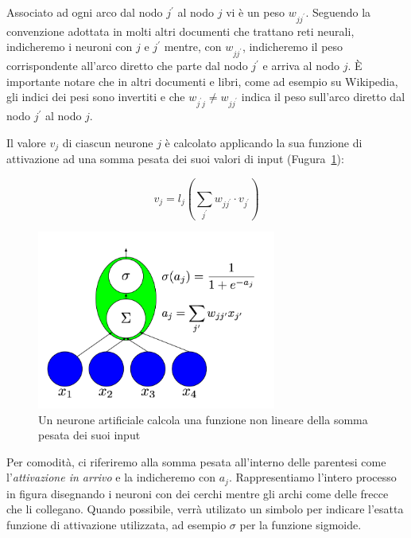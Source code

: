 Associato ad ogni arco dal nodo $j^{'}$ al nodo $j$ vi \`e un peso $w_{jj^{'}}$.
Seguendo la convenzione adottata in molti altri documenti che trattano reti neurali,
indicheremo i neuroni con $j$ e $j^{'}$ mentre, con $w_{jj^{'}}$, indicheremo il
peso corrispondente all'arco diretto che parte dal nodo $j^{'}$ e arriva al nodo $j$.
\`E importante notare che in altri documenti e libri, come ad esempio su Wikipedia,
gli indici dei pesi sono invertiti e che $w_{j^{'}j} \neq w_{jj^{'}}$ indica il
peso sull'arco diretto dal nodo $j^{'}$ al nodo $j$.

Il valore $v_j$ di ciascun neurone $j$ \`e calcolato applicando la sua funzione
di attivazione ad una somma pesata dei suoi valori di input
(Fugura~\ref{fig:artificialNeuron}): %

\begin{equation} %
  v_j = l_j\left( \sum_{j^{'}} w_{jj^{'}} \cdot v_{j^{'}} \right)
\end{equation}

\begin{figure}[tp]
  \centering
  \begin{center}
    \includegraphics[width=0.7\textwidth]{./images/artificialNeuron.png}
  \end{center}
  \caption{Un neurone artificiale calcola una funzione non lineare della somma pesata dei suoi input}
  \label{fig:artificialNeuron}
\end{figure}

Per comodit\`a, ci riferiremo alla somma pesata all'interno delle parentesi come
l'\emph{attivazione in arrivo} e la indicheremo con $a_j$. Rappresentiamo
l'intero processo in figura disegnando i neuroni con dei cerchi mentre gli archi
come delle frecce che li collegano. Quando possibile, verr\`a utilizato un simbolo
per indicare l'esatta funzione di attivazione utilizzata, ad esempio $\sigma$ per
la funzione sigmoide.

